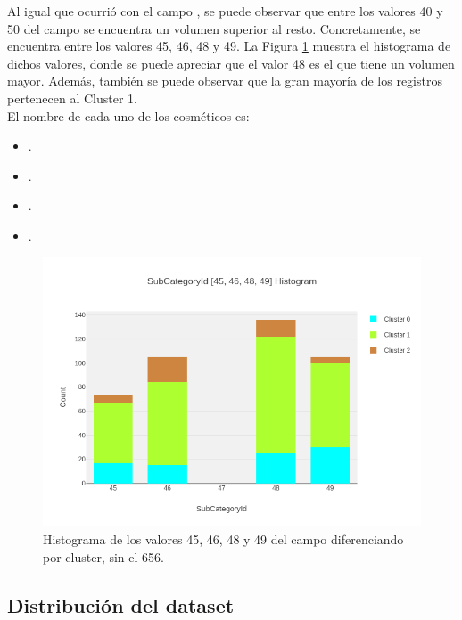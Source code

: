 Al igual que ocurrió con el campo , se puede observar que entre los valores 40 y 50 del campo  se encuentra un volumen superior al resto. Concretamente, se encuentra entre los valores 45, 46, 48 y 49. La Figura \ref{fig:histogram-subcategoryid-45-49} muestra el histograma de dichos valores, donde se puede apreciar que el valor  48 es el que tiene un volumen mayor. Además, también se puede observar que la gran mayoría de los registros pertenecen al Cluster 1. \\

El nombre de cada uno de los cosméticos es:

\begin{itemize}
 \item {}.
 \item {}.
 \item {}.
 \item {}.
\end{itemize}


\newpage
\begin{figure}[!th]
\includegraphics[scale=0.5]{figures/histogram-subcategoryid-45-49}
\centering
\caption{Histograma de los valores 45, 46, 48 y 49 del campo  diferenciando por cluster, sin el  656.}
\label{fig:histogram-subcategoryid-45-49}
\end{figure}



\newpage
\subsection{Distribución del dataset}
\label{sec:dataset-distribution}

